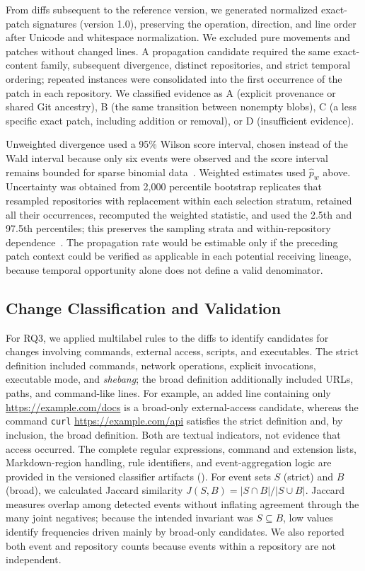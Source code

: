 \documentclass[conference]{IEEEtran}
\begin{document}
From diffs subsequent to the reference version, we generated normalized exact-patch signatures (version 1.0), preserving the operation, direction, and line order after Unicode and whitespace normalization. We excluded pure movements and patches without changed lines. A propagation candidate required the same exact-content family, subsequent divergence, distinct repositories, and strict temporal ordering; repeated instances were consolidated into the first occurrence of the patch in each repository. We classified evidence as A (explicit provenance or shared Git ancestry), B (the same transition between nonempty blobs), C (a less specific exact patch, including addition or removal), or D (insufficient evidence).

Unweighted divergence used a 95\% Wilson score interval, chosen instead of the Wald interval because only six events were observed and the score interval remains bounded for sparse binomial data~\cite{wilson1927}. Weighted estimates used $\hat p_w$ above. Uncertainty was obtained from 2,000 percentile bootstrap replicates that resampled repositories with replacement within each selection stratum, retained all their occurrences, recomputed the weighted statistic, and used the 2.5th and 97.5th percentiles; this preserves the sampling strata and within-repository dependence~\cite{raowu1988}. The propagation rate would be estimable only if the preceding patch context could be verified as applicable in each potential receiving lineage, because temporal opportunity alone does not define a valid denominator.

\subsection{Change Classification and Validation}

For RQ3, we applied multilabel rules to the diffs to identify candidates for changes involving commands, external access, scripts, and executables. The strict definition included commands, network operations, explicit invocations, executable mode, and \textit{shebang}; the broad definition additionally included URLs, paths, and command-like lines. For example, an added line containing only \url{https://example.com/docs} is a broad-only external-access candidate, whereas the command \texttt{curl} \url{https://example.com/api} satisfies the strict definition and, by inclusion, the broad definition. Both are textual indicators, not evidence that access occurred. The complete regular expressions, command and extension lists, Markdown-region handling, rule identifiers, and event-aggregation logic are provided in the versioned classifier artifacts (). For event sets $S$ (strict) and $B$ (broad), we calculated Jaccard similarity $J(S,B)=|S\cap B|/|S\cup B|$. Jaccard measures overlap among detected events without inflating agreement through the many joint negatives; because the intended invariant was $S\subseteq B$, low values identify frequencies driven mainly by broad-only candidates. We also reported both event and repository counts because events within a repository are not independent.
\end{document}
